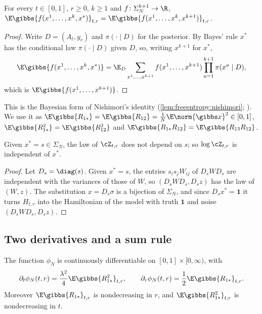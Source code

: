 \begin{refsection}
\begin{lemma}\label{lem:nishimori:nishimori}
For every $t\in[0,1]$, $r\ge0$, $k\ge1$ and $f\colon\Sigma_N^{k+1}\to\R$,
$\E\gibbs{f(x^1,\dots,x^k,x^*)}_{t,r}=\E\gibbs{f(x^1,\dots,x^k,x^{k+1})}_{t,r}$.
\end{lemma}

\begin{proof}
Write $D=(A_t,y_r)$ and $\pi(\cdot\mid D)$ for the posterior. By Bayes' rule $x^*$ has the conditional law $\pi(\cdot\mid D)$ given $D$, so, writing $x^{k+1}$ for $x^*$,
\[
\E\gibbs{f(x^1,\dots,x^k,x^*)}=\E_D\sum_{x^1,\dots,x^{k+1}}f(x^1,\dots,x^{k+1})\prod_{a=1}^{k+1}\pi(x^a\mid D),
\]
which is $\E\gibbs{f(x^1,\dots,x^{k+1})}$.\qedhere
\end{proof}

This is the Bayesian form of Nishimori's identity (\cref{lem:freeentropy:nishimori}; \textcite[Proposition~16]{LelargeMiolane2019}). We use it as $\E\gibbs{R_{1*}}=\E\gibbs{R_{12}}=\frac1N\E\norm{\gibbs x}^2\in[0,1]$, $\E\gibbs{R_{1*}^2}=\E\gibbs{R_{12}^2}$ and $\E\gibbs{R_{1*}R_{12}}=\E\gibbs{R_{13}R_{12}}$.

\begin{lemma}\label{lem:nishimori:gauge}
Given $x^*=s\in\Sigma_N$, the law of $\cZ_{t,r}$ does not depend on $s$; so $\log\cZ_{t,r}$ is independent of $x^*$.
\end{lemma}

\begin{proof}
Let $D_s=\diag(s)$. Given $x^*=s$, the entries $s_is_jW_{ij}$ of $D_sWD_s$ are independent with the variances of those of $W$, so $(D_sWD_s,D_sz)$ has the law of $(W,z)$. The substitution $x=D_s\sigma$ is a bijection of $\Sigma_N$, and since $D_sx^*=\mathbf1$ it turns $H_{t,r}$ into the Hamiltonian of the model with truth $\mathbf1$ and noise $(D_sWD_s,D_sz)$.
\end{proof}

\subsection{Two derivatives and a sum rule}

\begin{lemma}\label{lem:nishimori:derivatives}
The function $\phi_N$ is continuously differentiable on $[0,1]\times[0,\infty)$, with
\[
\partial_t\phi_N(t,r)=\frac{\lambda^2}4\E\gibbs{R_{1*}^2}_{t,r},\qquad\partial_r\phi_N(t,r)=\frac12\E\gibbs{R_{1*}}_{t,r}.
\]
Moreover $\E\gibbs{R_{1*}}_{t,r}$ is nondecreasing in $r$, and $\E\gibbs{R_{1*}^2}_{t,r}$ is nondecreasing in $t$.
\end{lemma}


\end{refsection}
